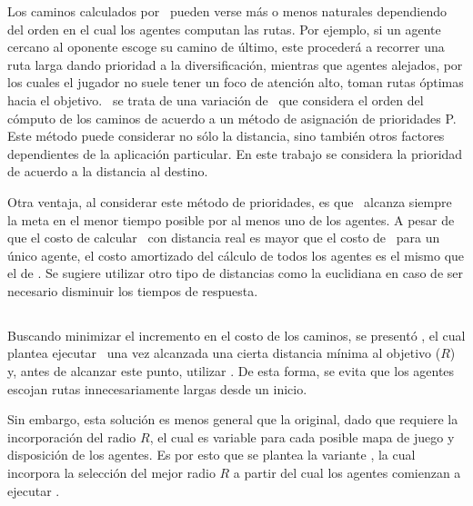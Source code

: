Los caminos calculados por \ambush\ pueden verse m\'as o menos
naturales dependiendo del orden en el cual los agentes computan
las rutas. Por ejemplo, si un agente cercano al oponente escoge
su camino de \'ultimo, este pro\-ce\-de\-r\'a a recorrer una ruta
larga dando prioridad a la diversificaci\'on, mientras que
agentes alejados, por los cuales el jugador no suele tener un
foco de atenci\'on alto, toman rutas \'optimas hacia el objetivo.
\pambush\ se trata de una variaci\'on de \ambush\ que considera el
orden del c\'omputo de los caminos de acuerdo a un m\'etodo de
asignaci\'on de prioridades P. Este m\'etodo puede considerar
no s\'olo la distancia, sino tambi\'en otros factores dependientes
de la aplicaci\'on particular. En este trabajo se considera la
prioridad de acuerdo a la distancia al destino.

Otra ventaja, al considerar este m\'etodo de prioridades, es que
\pambush\ alcanza siempre la meta en el menor tiempo posible por al
menos uno de los agentes. A pesar de que el costo de calcular
\pambush\ con distancia real es mayor que el costo de \ambush\ 
para un \'unico agente, el costo amortizado del c\'alculo de
todos los agentes es el mismo que el de \ambush. Se sugiere
utilizar otro tipo de distancias como la euclidiana en caso
de ser necesario disminuir los tiempos de respuesta.

\subsection{\rambush}

Buscando minimizar el incremento en el costo de los caminos,
se present\'o \rambush, el cual plantea ejecutar \ambush\ una
vez alcanzada una cierta distancia m\'inima al objetivo ($R$) y,
antes de alcanzar este punto, utilizar \astar. De esta forma,
se evita que los agentes escojan rutas in\-ne\-ce\-sa\-ria\-men\-te
largas desde un inicio.

Sin embargo, esta soluci\'on es menos general que la o\-ri\-gi\-nal,
dado que requiere la incorporaci\'on del radio $R$, el cual es
variable para cada posible mapa de juego y disposici\'on de los
agentes. Es por esto que se plantea la variante \sarambush, la
cual incorpora la selecci\'on del mejor radio $R$ a partir del
cual los agentes comienzan a ejecutar \ambush.

\subsection{\sarambush}

